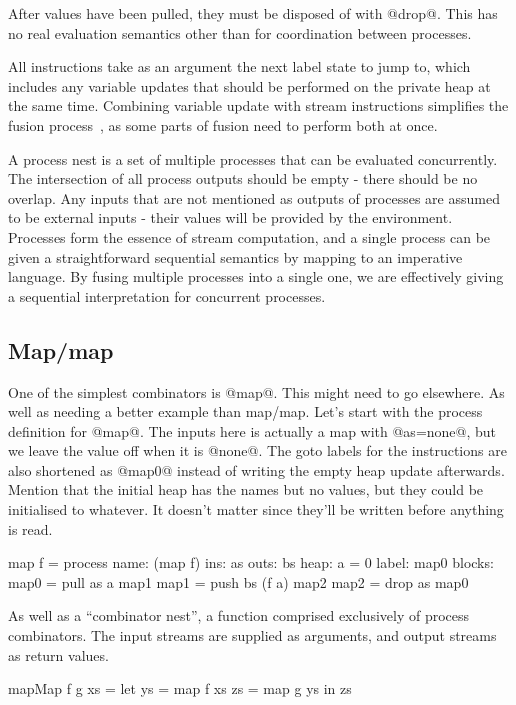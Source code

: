 After values have been pulled, they must be disposed of with @drop@.
This has no real evaluation semantics other than for coordination between processes.

All instructions take as an argument the next label state to jump to, which includes any variable updates that should be performed on the private heap at the same time.
Combining variable update with stream instructions simplifies the fusion process~\REF, as some parts of fusion need to perform both at once.


A process nest is a set of multiple processes that can be evaluated concurrently.
The intersection of all process outputs should be empty - there should be no overlap.
Any inputs that are not mentioned as outputs of processes are assumed to be external inputs - their values will be provided by the environment.
Processes form the essence of stream computation, and a single process can be given a straightforward sequential semantics by mapping to an imperative language.
By fusing multiple processes into a single one, we are effectively giving a sequential interpretation for concurrent processes.


\subsection{Map/map}
\label{s:Process:MapMap}

One of the simplest combinators is @map@.
This might need to go elsewhere.
As well as needing a better example than map/map.
Let's start with the process definition for @map@.
The inputs here is actually a map with @as=none@, but we leave the value off when it is @none@.
The goto labels for the instructions are also shortened as @map0@ instead of writing the empty heap update afterwards.
Mention that the initial heap has the names but no values, but they could be initialised to whatever.
It doesn't matter since they'll be written before anything is read.

\begin{code}
map f = process
    name: (map f)
     ins: as
    outs: bs
    heap: {a = 0}
   label: map0
  blocks: map0 = pull as    a  map1
          map1 = push bs (f a) map2
          map2 = drop as       map0
\end{code}

As well as a ``combinator nest'', a function comprised exclusively of process combinators.
The input streams are supplied as arguments, and output streams as return values.
\begin{code}
mapMap f g xs
 = let ys = map f xs
       zs = map g ys
   in  zs
\end{code}

